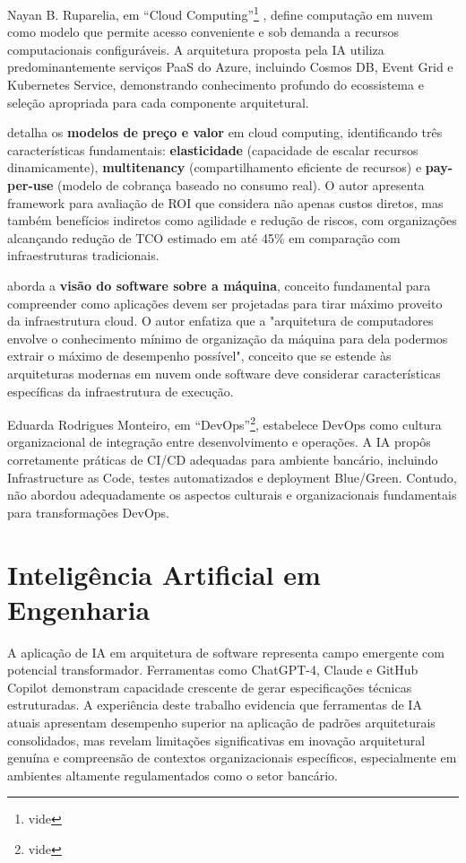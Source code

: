 Nayan B. Ruparelia, em ``Cloud Computing''\footnote{vide } , define computação em nuvem como modelo que permite acesso conveniente e sob demanda a recursos computacionais configuráveis. A arquitetura proposta pela IA utiliza predominantemente serviços PaaS do Azure, incluindo Cosmos DB, Event Grid e Kubernetes Service, demonstrando conhecimento profundo do ecossistema e seleção apropriada para cada componente arquitetural.

 detalha os \textbf{modelos de preço e valor} em cloud computing, identificando três características fundamentais: \textbf{elasticidade} (capacidade de escalar recursos dinamicamente), \textbf{multitenancy} (compartilhamento eficiente de recursos) e \textbf{pay-per-use} (modelo de cobrança baseado no consumo real). O autor apresenta framework para avaliação de ROI que considera não apenas custos diretos, mas também benefícios indiretos como agilidade e redução de riscos, com organizações alcançando redução de TCO estimado em até 45\% em comparação com infraestruturas tradicionais.

 aborda a \textbf{visão do software sobre a máquina}, conceito fundamental para compreender como aplicações devem ser projetadas para tirar máximo proveito da infraestrutura cloud. O autor enfatiza que a "arquitetura de computadores envolve o conhecimento mínimo de organização da máquina para dela podermos extrair o máximo de desempenho possível", conceito que se estende às arquiteturas modernas em nuvem onde software deve considerar características específicas da infraestrutura de execução.

Eduarda Rodrigues Monteiro, em ``DevOps''\footnote{vide }, estabelece DevOps como cultura organizacional de integração entre desenvolvimento e operações. A IA propôs corretamente práticas de CI/CD adequadas para ambiente bancário, incluindo Infrastructure as Code, testes automatizados e deployment Blue/Green. Contudo, não abordou adequadamente os aspectos culturais e organizacionais fundamentais para transformações DevOps.

\section{Inteligência Artificial em Engenharia}

A aplicação de IA em arquitetura de software representa campo emergente com potencial transformador. Ferramentas como ChatGPT-4, Claude e GitHub Copilot demonstram capacidade crescente de gerar especificações técnicas estruturadas. A experiência deste trabalho evidencia que ferramentas de IA atuais apresentam desempenho superior na aplicação de padrões arquiteturais consolidados, mas revelam limitações significativas em inovação arquitetural genuína e compreensão de contextos organizacionais específicos, especialmente em ambientes altamente regulamentados como o setor bancário.

